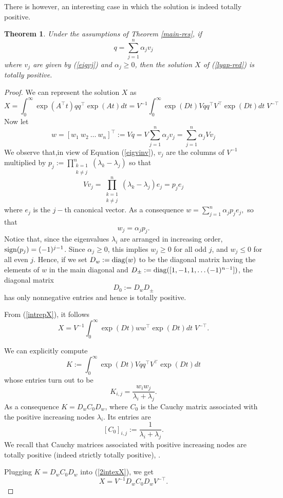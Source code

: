 \documentclass[12pt]{article}
\newcommand{\tp}{^{\top}}
\newcommand{\beq}{\begin{equation}}
\newcommand{\eeq}{\end{equation}}
\newtheorem{theorem}{Theorem}
\begin{document}
There is however, an interesting case in which the solution is indeed totally positive.

\begin{theorem}
Under the assumptions of Theorem \ref{main-res}, if 
$$
q=\sum_{j=1}^n \alpha_j v_j$$
where $v_j$ are given by (\ref{eigvj}) and $\alpha_j\geq 0$, 
then the solution $X$ of (\ref{lyap-red}) is totally positive.
\end{theorem}
\begin{proof}
We can represent the solution $X$ 
as
\beq\label{intrepX}
X=\int_{0}^{\infty}\exp(A\tp t)qq\tp\exp(A t)dt=
V^{-1} \int_{0}^{\infty}\exp(D t)Vqq\tp V\tp \exp(D t)dt\;V^{-\top}
\eeq
Now let 
$$w=[w_1\ w_2\ \dots\ w_n]\tp:=Vq=V \sum_{j=1}^n \alpha_j v_j=
\sum_{j=1}^n \alpha_j V  v_j$$
We observe that,in view of Equation (\ref{eigvinv}), $v_j$ are the columns of $V^{-1}$ multiplied by
$p_j:={\prod_{\substack{k=1 \\ k \neq j}}^n (\lambda_k - \lambda_j)}$
so that
$$
V  v_j={\prod_{\substack{k=1 \\ k \neq j}}^n (\lambda_k - \lambda_j)} e_j=p_je_j$$
where $e_j$ is the $j-$th canonical vector.
As a consequence
$
w=\sum_{j=1}^n \alpha_jp_je_j,$ so that
$$w_j= \alpha_j p_j.$$
Notice that, since the eigenvalues $\lambda_i$ are arranged in increasing order, ${\rm sign}(p_j)=(-1)^{j-1}$. Since $\alpha_j\geq 0$, this implies
$w_j\geq 0$ for all odd $j$, and $w_j\leq 0$ for all even $j$.
Hence, if we set $D_w:={\rm{diag}}(w)$ to be the diagonal matrix having the elements of $w$ in the main diagonal and $D_{\pm}:={\rm{diag}}([1,-1,1,\dots (-1)^{n-1}])$, the diagonal matrix 
$$D_0:=D_w D_{\pm}$$ 
has only nonnegative entries and hence is totally positive.
 

From (\ref{intrepX}), it follows
\beq\label{2intexX}
X=
V^{-1} \int_{0}^{\infty}\exp(D t)w w\tp \exp(D t)dt\;V^{-\top}.
\eeq

We can explicitly compute 
$$K:=\int_{0}^{\infty}\exp(D t)Vqq\tp V\tp \exp(D t)dt$$
whose entries turn out to be
$$
K_{i,j}=\frac{w_iw_j}{\lambda_i+\lambda_j}.$$
As a consequence $K=D_w C_0 D_w$, where $C_0$ is the Cauchy matrix associated with the positive increasing nodes $\lambda_i$. Its entries are
$$
[C_0]_{i,j}:=\frac{1}{\lambda_i+\lambda_j}.$$
We recall that Cauchy matrices associated with positive increasing nodes
are totally positive (indeed strictly totally positive), \cite[page 92]{Pinkus-TPM}.

Plugging $K=D_w C_0 D_w$ into (\ref{2intexX}), we get
$$
X=V^{-1}D_w C_0 D_wV^{-\top}.
$$


\end{proof}
\end{document}
